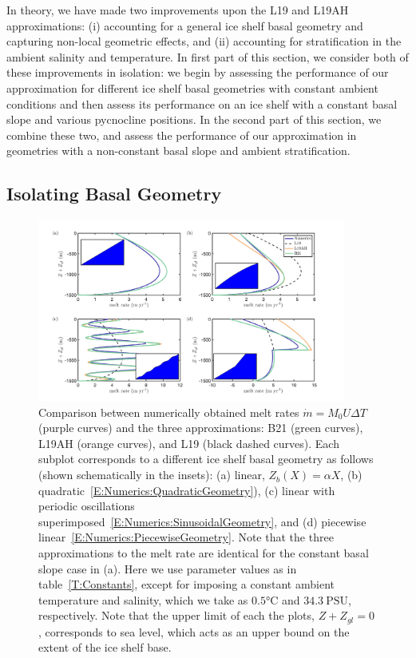 \documentclass[openacc]{rsproca_new}%
\begin{document}
In theory, we have made two improvements upon the L19 and L19AH approximations: (i) accounting for a general ice shelf basal geometry and capturing non-local geometric effects, and (ii) accounting for stratification in the ambient salinity and temperature. In first part of this section, we consider both of these improvements in isolation: we begin by assessing the performance of our approximation for different ice shelf basal geometries with constant ambient conditions and then assess its performance on an ice shelf with a constant basal slope and various pycnocline positions. In the second part of this section, we combine these two, and assess the performance of our approximation in geometries with a non-constant basal slope and ambient stratification.

\subsection{Isolating Basal Geometry}\label{S:Numerics:NoPycnocline}
\begin{figure}
\centering
\includegraphics[width = 0.9\textwidth]{Submitted_PRSA/make_plots/plots/figure6.png}
\caption{Comparison between numerically obtained melt rates $\dot{m}= M_0 U \Delta T$ (purple curves) and the three approximations: B21 (green curves), L19AH (orange curves), and L19 (black dashed curves). Each subplot corresponds to a different ice shelf basal geometry as follows (shown schematically in the insets): (a) linear, $Z_b(X) = \alpha X$, (b) quadratic~\eqref{E:Numerics:QuadraticGeometry}), (c) linear with periodic oscillations superimposed~\eqref{E:Numerics:SinusoidalGeometry}, and (d) piecewise linear~\eqref{E:Numerics:PiecewiseGeometry}. Note that the three approximations to the melt rate are identical for the constant basal slope case in (a).  Here we use parameter values as in table~\ref{T:Constants}, except for imposing a constant ambient temperature and salinity, which we take as $ 0.5\si{\celsius}$ and $34.3~\text{PSU}$, respectively. Note that the upper limit of each the plots, $Z + Z_{gl} = 0$, corresponds to sea level, which acts as an upper bound on the extent of the ice shelf base.}   \label{fig:Numerics:Geometry}
\end{figure}
\end{document}
